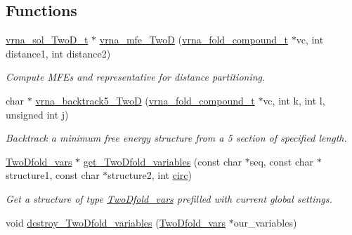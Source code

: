 \subsection*{Functions}
\begin{DoxyCompactItemize}
\item 
\mbox{\hyperlink{group__kl__neighborhood__mfe_structvrna__sol___two_d__t}{vrna\+\_\+sol\+\_\+\+Two\+D\+\_\+t}} $\ast$ \mbox{\hyperlink{group__kl__neighborhood__mfe_ga243c288b463147352829df04de6a2f77}{vrna\+\_\+mfe\+\_\+\+TwoD}} (\mbox{\hyperlink{group__fold__compound_ga1b0cef17fd40466cef5968eaeeff6166}{vrna\+\_\+fold\+\_\+compound\+\_\+t}} $\ast$vc, int distance1, int distance2)
\begin{DoxyCompactList}\small\item\em Compute M\+FE\textquotesingle{}s and representative for distance partitioning. \end{DoxyCompactList}\item 
char $\ast$ \mbox{\hyperlink{group__kl__neighborhood__mfe_ga15a96fc96f4f4c2e01a11b3e17d1ef43}{vrna\+\_\+backtrack5\+\_\+\+TwoD}} (\mbox{\hyperlink{group__fold__compound_ga1b0cef17fd40466cef5968eaeeff6166}{vrna\+\_\+fold\+\_\+compound\+\_\+t}} $\ast$vc, int k, int l, unsigned int j)
\begin{DoxyCompactList}\small\item\em Backtrack a minimum free energy structure from a 5\textquotesingle{} section of specified length. \end{DoxyCompactList}\item 
\mbox{\hyperlink{group__kl__neighborhood__mfe_struct_two_dfold__vars}{Two\+Dfold\+\_\+vars}} $\ast$ \mbox{\hyperlink{group__kl__neighborhood__mfe_gac9284f132cf0eaa0a2f43590eda05488}{get\+\_\+\+Two\+Dfold\+\_\+variables}} (const char $\ast$seq, const char $\ast$structure1, const char $\ast$structure2, int \mbox{\hyperlink{group__model__details_gaf9202a1a09f5828dc731e2d9a10fa111}{circ}})
\begin{DoxyCompactList}\small\item\em Get a structure of type \mbox{\hyperlink{group__kl__neighborhood__mfe_struct_two_dfold__vars}{Two\+Dfold\+\_\+vars}} prefilled with current global settings. \end{DoxyCompactList}\item 
void \mbox{\hyperlink{group__kl__neighborhood__mfe_ga05bf4f31d216b1b160fd2d3d68e9b487}{destroy\+\_\+\+Two\+Dfold\+\_\+variables}} (\mbox{\hyperlink{group__kl__neighborhood__mfe_struct_two_dfold__vars}{Two\+Dfold\+\_\+vars}} $\ast$our\+\_\+variables)

\end{DoxyCompactItemize}
